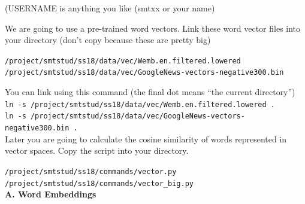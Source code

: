 \documentclass[12pt,fleqn]{article}
\begin{document}
(USERNAME is anything you like (smtxx or your name)

\vspace{0.5cm} 
We are going to use a pre-trained word vectors. Link these word vector files into your directory (don't copy because these are pretty big)

\vspace{0.5cm}
\texttt{/project/smtstud/ss18/data/vec/Wemb.en.filtered.lowered} 
\texttt{/project/smtstud/ss18/data/vec/GoogleNews-vectors-negative300.bin} 

You can link using this command (the final dot means ``the current directory'')\\
\texttt{ln -s /project/smtstud/ss18/data/vec/Wemb.en.filtered.lowered .} \\ 
\texttt{ln -s /project/smtstud/ss18/data/vec/GoogleNews-vectors-negative300.bin .} \\


\vspace{0.5cm} 
Later you are going to calculate the cosine similarity of words represented in vector spaces. Copy the script into your directory. 

\vspace{0.5cm} 
\texttt{/project/smtstud/ss18/commands/vector.py} \\
\texttt{/project/smtstud/ss18/commands/vector\_big.py} \\

\vspace{0.5cm} 
\textbf{A. Word Embeddings} \\ 
\end{document}
